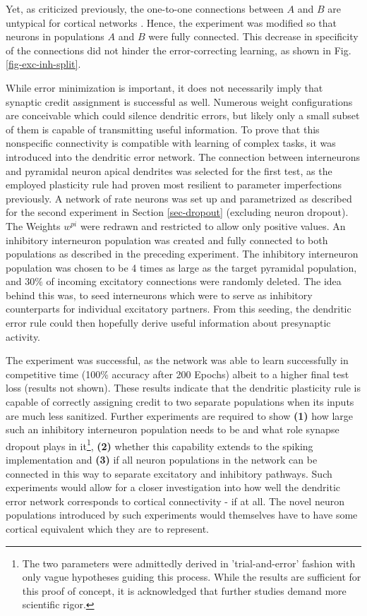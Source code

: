 Yet, as criticized previously, the one-to-one connections between \textbf{$A$} and \textbf{$B$} are untypical for
cortical networks \citep{douglas2004neuronal,Gordon2010}. Hence, the experiment was modified so that neurons in
populations \textbf{$A$} and \textbf{$B$} were fully connected. This decrease in specificity of the connections did not
hinder the error-correcting learning, as shown in Fig. \ref{fig-exc-inh-split}.

While error minimization is important, it does not necessarily imply that synaptic credit assignment is successful as
well. Numerous weight configurations are conceivable which could silence dendritic errors, but likely only a small
subset of them is capable of transmitting useful information. To prove that this nonspecific connectivity is compatible
with learning of complex tasks, it was introduced into the dendritic error network. The connection between interneurons
and pyramidal neuron apical dendrites was selected for the first test, as the employed plasticity rule had proven most
resilient to parameter imperfections previously. A network of rate neurons was set up and parametrized as described for
the second experiment in Section \ref{sec-dropout} (excluding neuron dropout). The Weights $w^{pi}$ were redrawn and
restricted to allow only positive values. An inhibitory interneuron population was created and fully connected to both
populations as described in the preceding experiment. The inhibitory interneuron population was chosen to be 4 times as
large as the target pyramidal population, and $30\%$ of incoming excitatory connections were randomly deleted. The idea
behind this was, to seed interneurons which were to serve as inhibitory counterparts for individual excitatory partners.
From this seeding, the dendritic error rule could then hopefully derive useful information about presynaptic activity.

The experiment was successful, as the network was able to learn successfully in competitive time (100\% accuracy after
200 Epochs) albeit to a higher final test loss (results not shown). These results indicate that the dendritic plasticity
rule is capable of correctly assigning credit to two separate populations when its inputs are much less sanitized.
Further experiments are required to show \textbf{(1)} how large such an inhibitory interneuron population needs to be
and what role synapse dropout plays in it\footnote{The two parameters were admittedly derived in 'trial-and-error'
fashion with only vague hypotheses guiding this process. While the results are sufficient for this proof of concept, it 
is acknowledged that further studies demand more scientific rigor.}, \textbf{(2)} whether this capability extends to the
spiking implementation and \textbf{(3)} if all neuron populations in the network can be connected in this way to
separate excitatory and inhibitory pathways. Such experiments would allow for a closer investigation into how well the
dendritic error network corresponds to cortical connectivity - if at all. The novel neuron populations introduced by
such experiments would themselves have to have some cortical equivalent which they are to represent. 



